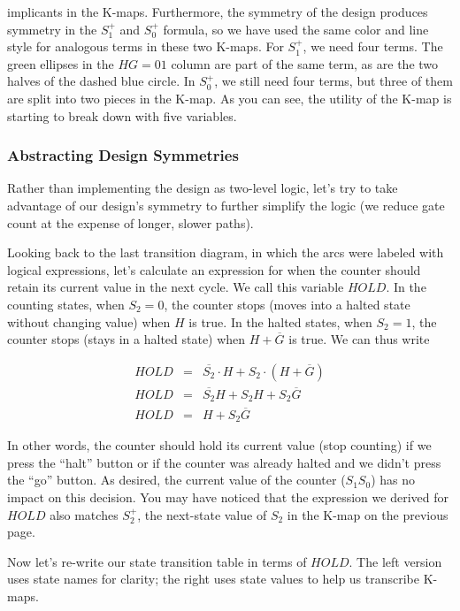 implicants in the K-maps.  Furthermore, the symmetry of the design
produces symmetry in the $S_1^+$ and $S_0^+$ formula, so we have
used the same color and line style for analogous terms in these
two K-maps.
%
For $S_1^+$, we need four terms.  The green 
ellipses in the $HG=01$ column are part of the same term, as are
the two halves of the dashed blue circle.  In $S_0^+$, we still
need four terms, but three of them are split into two pieces 
in the K-map.  As you can see, the utility of the K-map is starting
to break down with five variables.\\


\subsubsection{Abstracting Design Symmetries}

Rather than implementing the design as two-level logic, let's try to
take advantage of our design's symmetry to further simplify the
logic (we reduce gate count at the expense of longer, slower paths).

Looking back to the last transition diagram, in which the arcs
were labeled with logical expressions, let's calculate an expression
for when the counter should retain its current value in the next
cycle.  We call 
this variable $HOLD$.  In the counting states, when $S_2=0$, 
the counter stops (moves into a halted state without changing value) 
when $H$ is true.
In the halted states, when $S_2=1$, the counter stops (stays in 
a halted state) when $H+\overline{G}$ is true.  We can thus write

\begin{eqnarray*}
HOLD &=& \overline{S_2} \cdot H + S_2 \cdot ( H + \overline{G} )\\
HOLD &=& \overline{S_2} H + S_2 H + S_2 \overline{G}\\
HOLD &=& H + S_2 \overline{G}
\end{eqnarray*}

In other words, the counter should hold its current 
value (stop counting) if we press the ``halt'' button or if the counter
was already halted and we didn't press the ``go'' button.  As desired,
the current value of the counter ($S_1S_0$) has no impact on this 
decision.  You may have noticed that the expression we derived for
$HOLD$ also matches $S_2^+$, the next-state value of $S_2$ in the 
K-map on the previous page.

Now let's re-write our state transition table in terms of $HOLD$.  The
left version uses state names for clarity; the right uses state values
to help us transcribe K-maps.\\

